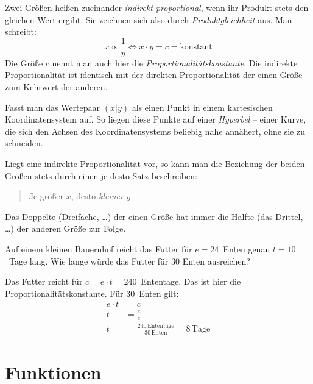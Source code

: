 \begin{defi}
 Zwei Größen heißen zueinander \emph{indirekt proportional}, wenn ihr Produkt stets den gleichen Wert ergibt. Sie zeichnen sich also durch \emph{Produktgleichheit} aus. Man schreibt:
 \begin{equation*}
  x \propto \frac{1}{y} \Leftrightarrow x\cdot y = c = \text{konstant}
 \end{equation*}
 Die Größe \(c\) nennt man auch hier die \emph{Proportionalitätskonstante}. Die indirekte Proportionalität ist identisch mit der direkten Proportionalität der einen Größe zum Kehrwert der anderen.
 
 Fasst man das Wertepaar \((x\vert y)\) als einen Punkt in einem kartesischen Koordinatensystem auf. So liegen diese Punkte auf einer \emph{Hyperbel} --  einer Kurve, die sich den Achsen des Koordinatensystems beliebig nahe annähert, ohne sie zu schneiden.

Liegt eine indirekte Proportionalität vor, so kann man die Beziehung der beiden Größen stets durch einen je-desto-Satz beschreiben:
\begin{quote}
 Je größer \(x\), desto \emph{kleiner} \(y\).
\end{quote}
Das Doppelte (Dreifache, \ldots) der einen Größe hat immer die Hälfte (das Drittel, \ldots) der anderen Größe zur Folge.
\end{defi}

\begin{bsp}
 Auf einem kleinen Bauernhof reicht das Futter für \(e=24\)~Enten genau \(t=10\)~Tage lang. Wie lange würde das Futter für 30 Enten ausreichen?
 
 Das Futter reicht für \(c=e\cdot t =240\)~Ententage. Das ist hier die Proportionalitätskonstante. Für 30~Enten gilt:
 \begin{align*}
  e\cdot t &= c \\
  t &= \frac{c}{e}\\
  t &= \frac{240\,\text{Ententage}}{30\,\text{Enten}} = 8\,\text{Tage}
 \end{align*}
\end{bsp}


\section{Funktionen}
